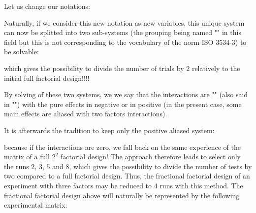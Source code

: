 	Let us change our notations:
	
	Naturally, if we consider this new notation as new variables, this unique system can now be splitted into two sub-systems (the grouping being named "" in this field but this is not corresponding to the vocabulary of the norm ISO 3534-3) to be solvable:
	
	which gives the possibility to divide the number of trials by $2$ relatively to the initial full factorial design!!!! 

	By solving of these two systems, we we say that the interactions are "" (also said in "") with the pure effects in negative or in positive (in the present case, some main effects are aliased with two factors interactions).
	
	It is afterwards the tradition to keep only the positive aliased system:
	
	because if the interactions are zero, we fall back on the same experience of the matrix of a full $2^2$ factorial design! The approach therefore leads to select only the runs $2$, $3$, $5$ and $8$, which gives the possibility to divide the number of tests by two compared to a full factorial design. Thus, the fractional factorial design of an experiment with three factors may be reduced to $4$ runs with this method. The fractional factorial design above will naturally be represented by the following experimental matrix:
	
